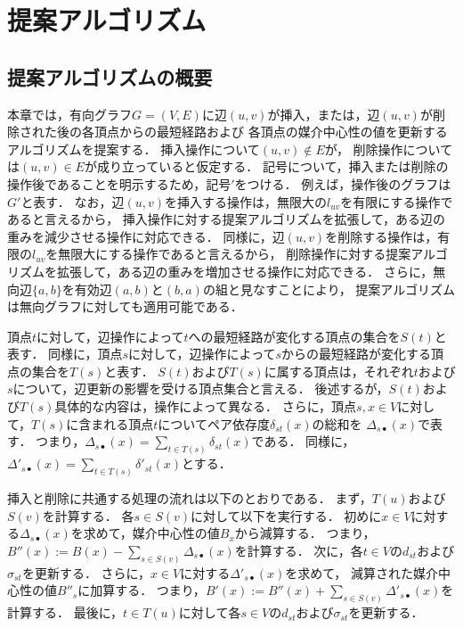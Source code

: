 \chapter{提案アルゴリズム}
\label{chap:algorithm}

\section{提案アルゴリズムの概要}

本章では，有向グラフ$G=(V,E)$に辺$(u,v)$が挿入，または，辺$(u,v)$が削除された後の各頂点からの最短経路および
各頂点の媒介中心性の値を更新するアルゴリズムを提案する．
挿入操作について$(u,v)\notin E$が，
削除操作については$(u,v)\in E$が成り立っていると仮定する．
記号について，挿入または削除の操作後であることを明示するため，記号$'$をつける．
例えば，操作後のグラフは$G'$と表す．
なお，辺$(u,v)$を挿入する操作は，無限大の$l_{uv}$を有限にする操作であると言えるから，
挿入操作に対する提案アルゴリズムを拡張して，ある辺の重みを減少させる操作に対応できる．
同様に，辺$(u,v)$を削除する操作は，有限の$l_{uv}$を無限大にする操作であると言えるから，
削除操作に対する提案アルゴリズムを拡張して，ある辺の重みを増加させる操作に対応できる．
さらに，無向辺$\{a,b\}$を有効辺$(a,b)$と$(b,a)$の組と見なすことにより，
提案アルゴリズムは無向グラフに対しても適用可能である．

頂点$t$に対して，辺操作によって$t$への最短経路が変化する頂点の集合を$S(t)$と表す．
同様に，頂点$s$に対して，辺操作によって$s$からの最短経路が変化する頂点の集合を$T(s)$と表す．
$S(t)$および$T(s)$に属する頂点は，それぞれ$t$および$s$について，辺更新の影響を受ける頂点集合と言える．
後述するが，$S(t)$および$T(s)$具体的な内容は，操作によって異なる．
さらに，頂点$s,x\in V$に対して，$T(s)$に含まれる頂点$t$についてペア依存度$\delta_{st}(x)$の総和を
$\Delta_{s\bullet}(x)$で表す\cite{Bergamini2017}．
つまり，$\Delta_{s\bullet}(x)=\sum_{t\in T(s)}\delta_{st}(x)$である．
同様に，$\Delta'_{s\bullet}(x)=\sum_{t\in T(s)}\delta'_{st}(x)$とする．

挿入と削除に共通する処理の流れは以下のとおりである．
まず，$T(u)$および$S(v)$を計算する．
各$s\in S(v)$に対して以下を実行する．
初めに$x\in V$に対する$\Delta_{s\bullet}(x)$を求めて，媒介中心性の値$B_x$から減算する．
つまり，$B''(x):=B(x)-\sum_{s\in S(v)}\Delta_{s\bullet}(x)$を計算する．
次に，各$t\in V$の$d_{st}$および$\sigma_{st}$を更新する．
さらに，$x\in V$に対する$\Delta'_{s\bullet}(x)$を求めて，
減算された媒介中心性の値$B''_s$に加算する．
つまり，$B'(x):=B''(x)+\sum_{s\in S(v)}\Delta'_{s\bullet}(x)$を計算する．
最後に，$t\in T(u)$に対して各$s\in V$の$d_{st}$および$\sigma_{st}$を更新する．

